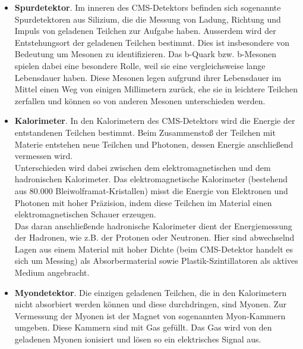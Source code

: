 \begin{itemize}
\item \textbf{Spurdetektor}. Im inneren des CMS-Detektors befinden sich sogenannte Spurdetektoren aus Silizium, die die Messung von Ladung, Richtung und Impuls von geladenen Teilchen zur Aufgabe haben. Ausserdem wird der Entstehungsort der geladenen Teilchen bestimmt. Dies ist insbesondere von Bedeutung um Mesonen zu identifizieren. Das b-Quark bzw. b-Mesonen spielen dabei eine besondere Rolle, weil sie eine vergleichsweise lange Lebensdauer haben. Diese Mesonen legen aufgrund ihrer Lebensdauer im Mittel einen Weg von einigen Millimetern zur\"uck, ehe sie in leichtere Teilchen zerfallen und k\"onnen so von anderen Mesonen unterschieden werden. 
\item \textbf{Kalorimeter}. In den Kalorimetern des CMS-Detektors wird die Energie der entstandenen Teilchen bestimmt. Beim Zusammensto{\ss} der Teilchen mit Materie entstehen neue Teilchen und Photonen, dessen Energie anschlie{\ss}end vermessen wird.\\
Unterschieden wird dabei zwischen dem elektromagnetischen und dem hadronischen Kalorimeter. Das elektromagnetische Kalorimeter (bestehend aus 80.000 Bleiwolframat-Kristallen) misst die Energie von Elektronen und Photonen mit hoher Pr\"azision, indem diese Teilchen im Material einen elektromagnetischen Schauer erzeugen.\\
Das daran anschlie{\ss}ende hadronische Kalorimeter dient der Energiemessung der Hadronen, wie z.B. der Protonen oder Neutronen. Hier sind abwechselnd Lagen aus einem Material mit hoher Dichte (beim CMS-Detektor handelt es sich um Messing) als Absorbermaterial sowie Plastik-Szintillatoren als aktives Medium angebracht.
\item \textbf{Myondetektor}. Die einzigen geladenen Teilchen, die in den Kalorimetern nicht absorbiert werden k\"onnen und diese durchdringen, sind Myonen. Zur Vermessung der Myonen ist der Magnet von sogenannten Myon-Kammern umgeben. Diese Kammern sind mit Gas gef\"ullt. Das Gas wird von den geladenen Myonen ionisiert und l\"osen so ein elektrisches Signal aus.
\end{itemize}


